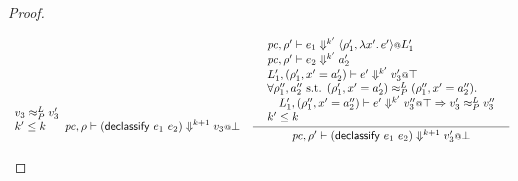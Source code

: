 \documentclass{article}
\makeatletter
\newcommand{\at}{\ensuremath{{\scriptstyle{@}}}}
\newcommand{\pc}{\ensuremath{{\mathit{pc}}}}
\theoremstyle{definition}
\makeatother
\begin{document}
\begin{proof}
\begin{description}
\begin{small}
\begin{gather*}
{{\begin{array}[b]{l}
            v_3 \approx^{L}_{P} v_3'
            \\
            k' \leq k
          \end{array}}
      }{
        \pc, \rho |- (\mathsf{declassify}\ e_1\ e_2) \Downarrow^{k+1}
        v_3 \at \bot
      }
      \quad
      \inference{
        {\begin{array}[b]{l}
            \pc, \rho' |- e_1 \Downarrow^{k'}
            \langle{\rho_1', \lambda{x'}.\, e'\rangle} \at L_1'
            \\
            \pc, \rho' |- e_2 \Downarrow^{k'} a_2'
            \\
            L_1',  (\rho_1', x' = a_2') |- e' \Downarrow^{k'} v_3' \at \top
            \\
            \forall{\rho_1'', a_2'' \text{ s.t. }
              (\rho_1', x' = a_2') \approx^{L}_{P} (\rho_1'', x' = a_2'')}.
            \\\quad
            L_1', (\rho_1'', x' = a_2'') |- e' \Downarrow^{k'} v_3'' \at \top =>
            v_3' \approx^{L}_{P} v_3''
            \\
            k' \leq k
          \end{array}}
      }{
        \pc, \rho' |- (\mathsf{declassify}\ e_1\ e_2) \Downarrow^{k+1}
        v_3' \at \bot
      }
    \end{gather*}
    \end{small}
  \end{description}
\end{proof}
\end{document}
